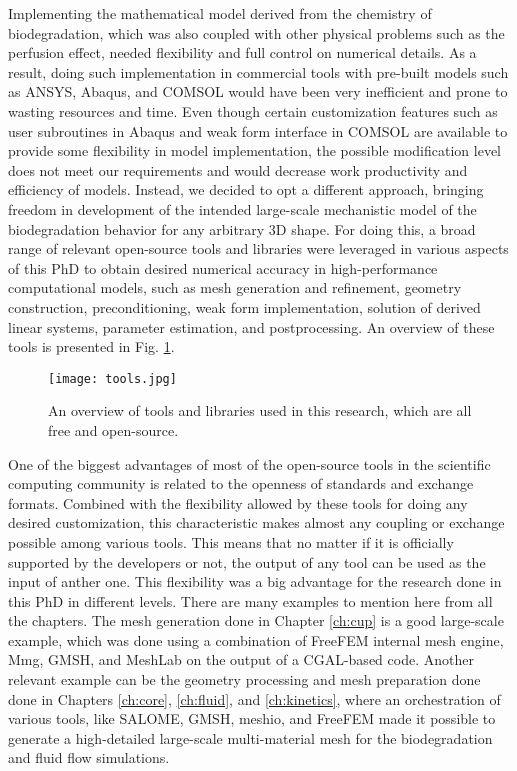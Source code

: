 Implementing the mathematical model derived from the chemistry of biodegradation, which was also coupled with other physical problems such as the perfusion effect, needed flexibility and full control on numerical details. As a result, doing such implementation in commercial tools with pre-built models such as ANSYS, Abaqus, and COMSOL would have been very inefficient and prone to wasting resources and time. Even though certain customization features such as user subroutines in Abaqus and weak form interface in COMSOL are available to provide some flexibility in model implementation, the possible modification level does not meet our requirements and would decrease work productivity and efficiency of models. Instead, we decided to opt a different approach, bringing freedom in development of the intended large-scale mechanistic model of the biodegradation behavior for any arbitrary 3D shape. For doing this, a broad range of relevant open-source tools and libraries were leveraged in various aspects of this PhD to obtain desired numerical accuracy in high-performance computational models, such as mesh generation and refinement, geometry construction, preconditioning, weak form implementation, solution of derived linear systems, parameter estimation, and postprocessing. An overview of these tools is presented in Fig. \ref{fig:conclusion_tools}.

\begin{figure}[h]
\centering
\medskip
\texttt{[image: tools.jpg]}
\caption[Overview of open-source tools and libraries used in this PhD]{An overview of tools and libraries used in this research, which are all free and open-source.} \label{fig:conclusion_tools}
\end{figure}

One of the biggest advantages of most of the open-source tools in the scientific computing community is related to the openness of standards and exchange formats. Combined with the flexibility allowed by these tools for doing any desired customization, this characteristic makes almost any coupling or exchange possible among various tools. This means that no matter if it is officially supported by the developers or not, the output of any tool can be used as the input of anther one. This flexibility was a big advantage for the research done in this PhD in different levels. There are many examples to mention here from all the chapters. The mesh generation done in Chapter \ref{ch:cup} is a good large-scale example, which was done using a combination of FreeFEM internal mesh engine, Mmg, GMSH, and MeshLab on the output of a CGAL-based code. Another relevant example can be the geometry processing and mesh preparation done done in Chapters \ref{ch:core}, \ref{ch:fluid}, and \ref{ch:kinetics}, where an orchestration of various tools, like SALOME, GMSH, meshio, and FreeFEM made it possible to generate a high-detailed large-scale multi-material mesh for the biodegradation and fluid flow simulations. 

